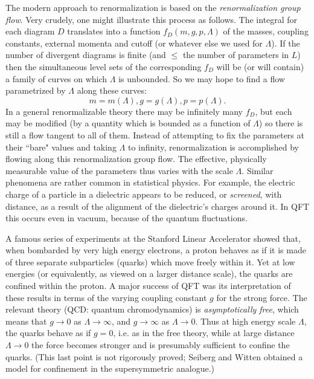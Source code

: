 The modern approach to renormalization is based on the {\it 
renormalization group flow}. Very crudely, one might illustrate 
this process as follows. The 
integral for each diagram $D$ translates into a function 
$f_D(m,g,p, \Lambda)$ of the masses, coupling constants, external 
momenta and  cutoff (or whatever else we used for $\Lambda$). If 
the number of divergent diagrams is finite (and $\leq$ the number
of parameters in $L$) then the simultaneous level sets of the 
corresponding $f_D$ will be (or will contain) a family of curves 
on which $\Lambda$ is unbounded. So we may hope to find a flow 
parametrized by $\Lambda$ along these curves:
$$ m=m(\Lambda), g=g(\Lambda), p=p(\Lambda).$$
In a general renormalizable theory there may be infinitely many 
$f_D$, but each may be modified (by a quantity which is bounded 
as a function of $\Lambda$) so there is still a flow tangent to 
all of them. Instead of attempting to fix the parameters at their 
``bare" values and taking $\Lambda$ to infinity, renormalization 
is accomplished by flowing along this renormalization group flow. 
The effective, physically measurable value of the parameters thus 
varies with the scale $\Lambda$. Similar phenomena are rather 
common in statistical physics. For example, the electric charge 
of a particle in a dielectric appears to be reduced, or 
{\it screened}, with distance, as a result of the alignment of 
the dielectric's charges around it. In QFT this occurs even in 
vacuum, because of the quantum fluctuations. 

A famous series of experiments at 
the Stanford Linear Accelerator showed that, when bombarded 
by very high energy electrons, a proton behaves as if it is made 
of three separate subparticles (quarks) which move freely within 
it. Yet at low energies (or equivalently, as viewed on a larger 
distance scale), the quarks are confined within the proton. A 
major success of QFT was its interpretation of these results in 
terms of the varying coupling constant $g$ for the strong force. 
The relevant theory (QCD: quantum chromodynamics) 
is {\it asymptotically free}, which 
means that $g \rightarrow 0$ as $\Lambda \rightarrow \infty$, 
and  $g \rightarrow \infty$ as $\Lambda  \rightarrow 0$. Thus 
at high energy scale $\Lambda$, the quarks behave as if $g=0$, 
i.e. as in the free theory, while at large distance 
$\Lambda \rightarrow 0$ the force becomes stronger and is 
presumably sufficient to confine the quarks. (This last point 
is not rigorously proved; Seiberg and Witten obtained a model 
for confinement in the supersymmetric analogue.)

